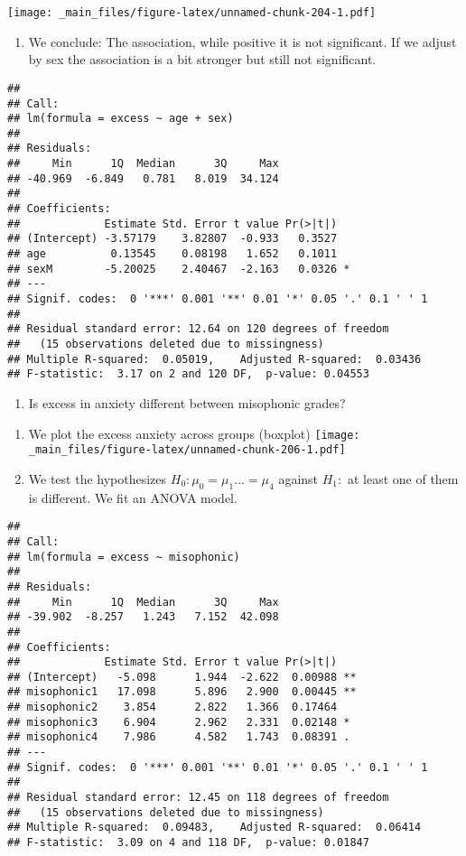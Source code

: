 \documentclass[
]{book}
\providecommand{\tightlist}{%
  \setlength{\itemsep}{0pt}\setlength{\parskip}{0pt}}
\begin{document}
\texttt{[image: \_main\_files/figure-latex/unnamed-chunk-204-1.pdf]}

\begin{enumerate}
\def\labelenumi{\alph{enumi}.}
\setcounter{enumi}{2}
\tightlist
\item
  We conclude: The association, while positive it is not significant. If we adjust by sex the association is a bit stronger but still not significant.
\end{enumerate}

\begin{verbatim}
## 
## Call:
## lm(formula = excess ~ age + sex)
## 
## Residuals:
##     Min      1Q  Median      3Q     Max 
## -40.969  -6.849   0.781   8.019  34.124 
## 
## Coefficients:
##             Estimate Std. Error t value Pr(>|t|)  
## (Intercept) -3.57179    3.82807  -0.933   0.3527  
## age          0.13545    0.08198   1.652   0.1011  
## sexM        -5.20025    2.40467  -2.163   0.0326 *
## ---
## Signif. codes:  0 '***' 0.001 '**' 0.01 '*' 0.05 '.' 0.1 ' ' 1
## 
## Residual standard error: 12.64 on 120 degrees of freedom
##   (15 observations deleted due to missingness)
## Multiple R-squared:  0.05019,    Adjusted R-squared:  0.03436 
## F-statistic:  3.17 on 2 and 120 DF,  p-value: 0.04553
\end{verbatim}

\begin{enumerate}
\def\labelenumi{\arabic{enumi}.}
\setcounter{enumi}{4}
\tightlist
\item
  Is excess in anxiety different between misophonic grades?
\end{enumerate}

\begin{enumerate}
\def\labelenumi{\alph{enumi}.}
\item
  We plot the excess anxiety across groups (boxplot)
  \texttt{[image: \_main\_files/figure-latex/unnamed-chunk-206-1.pdf]}
\item
  We test the hypothesizes \(H_0: \mu_{0}=\mu_{1} ... =\mu_{4}\) against \(H_1:\) at least one of them is different. We fit an ANOVA model.
\end{enumerate}

\begin{verbatim}
## 
## Call:
## lm(formula = excess ~ misophonic)
## 
## Residuals:
##     Min      1Q  Median      3Q     Max 
## -39.902  -8.257   1.243   7.152  42.098 
## 
## Coefficients:
##             Estimate Std. Error t value Pr(>|t|)   
## (Intercept)   -5.098      1.944  -2.622  0.00988 **
## misophonic1   17.098      5.896   2.900  0.00445 **
## misophonic2    3.854      2.822   1.366  0.17464   
## misophonic3    6.904      2.962   2.331  0.02148 * 
## misophonic4    7.986      4.582   1.743  0.08391 . 
## ---
## Signif. codes:  0 '***' 0.001 '**' 0.01 '*' 0.05 '.' 0.1 ' ' 1
## 
## Residual standard error: 12.45 on 118 degrees of freedom
##   (15 observations deleted due to missingness)
## Multiple R-squared:  0.09483,    Adjusted R-squared:  0.06414 
## F-statistic:  3.09 on 4 and 118 DF,  p-value: 0.01847
\end{verbatim}
\end{document}
